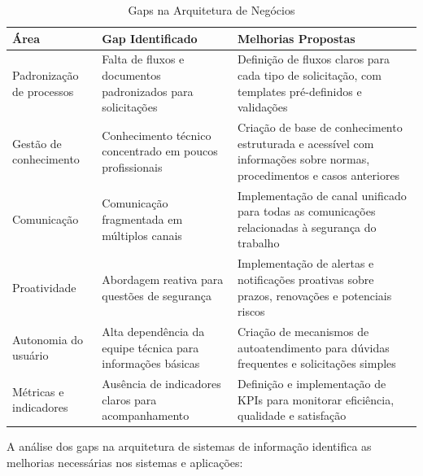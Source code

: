 \documentclass[12pt,a4paper]{article}
\begin{document}
\begin{table}[h]
\centering
\begin{tcolorbox}[enhanced, colback=white, colframe=gray!40, arc=3mm, boxrule=0.5pt]
\scriptsize
\begin{tabular}{|p{2.5cm}|p{4cm}|p{5cm}|}
\hline
\rowcolor{gray!20}
\textbf{Área} & \textbf{Gap Identificado} & \textbf{Melhorias Propostas} \\
\hline
Padronização de processos & Falta de fluxos e documentos padronizados para solicitações & Definição de fluxos claros para cada tipo de solicitação, com templates pré-definidos e validações \\
\hline
Gestão de conhecimento & Conhecimento técnico concentrado em poucos profissionais & Criação de base de conhecimento estruturada e acessível com informações sobre normas, procedimentos e casos anteriores \\
\hline
Comunicação & Comunicação fragmentada em múltiplos canais & Implementação de canal unificado para todas as comunicações relacionadas à segurança do trabalho \\
\hline
Proatividade & Abordagem reativa para questões de segurança & Implementação de alertas e notificações proativas sobre prazos, renovações e potenciais riscos \\
\hline
Autonomia do usuário & Alta dependência da equipe técnica para informações básicas & Criação de mecanismos de autoatendimento para dúvidas frequentes e solicitações simples \\
\hline
Métricas e indicadores & Ausência de indicadores claros para acompanhamento & Definição e implementação de KPIs para monitorar eficiência, qualidade e satisfação \\
\hline
\end{tabular}
\end{tcolorbox}
\caption{Gaps na Arquitetura de Negócios}
\end{table}

A análise dos gaps na arquitetura de sistemas de informação identifica as melhorias necessárias nos sistemas e aplicações:
\end{document}
